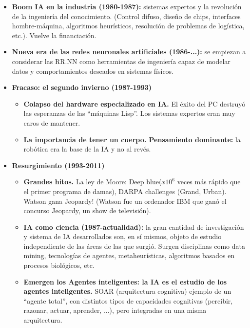\documentclass{article}
\begin{document}
\begin{itemize}
\item \textbf{Boom IA en la industria (1980-1987):} sistemas expertos y la revolución de la ingeniería del conocimiento. (Control difuso, diseño de chips, interfaces hombre-máquina, algoritmos heurísticos, resolución de problemas de logística, etc.). Vuelve la financiación.

\item \textbf{Nueva era de las redes neuronales artificiales (1986-...):} se empiezan a considerar las RR.NN como herramientas de ingeniería capaz de modelar datos y comportamientos deseados en sistemas físicos.

\item \textbf{Fracaso: el segundo invierno (1987-1993)}

\begin{itemize}
\item \textbf{Colapso del hardware especializado en IA.} El éxito del PC destruyó las esperanzas de las ``máquinas Lisp''. Los sistemas expertos eran muy caros de mantener.

\item \textbf{La importancia de tener un cuerpo. Pensamiento dominante:} la robótica era la base de la IA y no al revés.
\end{itemize}

\item \textbf{Resurgimiento (1993-2011)}

\begin{itemize}
\item \textbf{Grandes hitos.} La ley de Moore: Deep blue($x10^6$ veces más rápido que el primer programa de damas), DARPA challenges (Grand, Urban). Watson gana Jeopardy! (Watson fue un ordenador IBM que ganó el concurso Jeopardy, un show de televisión).

\item \textbf{IA como ciencia (1987-actualidad):} la gran cantidad de investigación y sistema de IA desarrollados son, en sí mismos, objeto de estudio independiente de las áreas de las que surgió. Surgen disciplinas como data mining, tecnologías de agentes, metaheurísticas, algoritmos basados en procesos biológicos, etc.

\item \textbf{Emergen los Agentes inteligentes: la IA es el estudio de los agentes inteligentes.} SOAR (arquitectura cognitiva) ejemplo de un ``agente total'', con distintos tipos de capacidades cognitivas (percibir, razonar, actuar, aprender, ...), pero integradas en una misma arquitectura.


\end{itemize}
\end{itemize}
\end{document}
